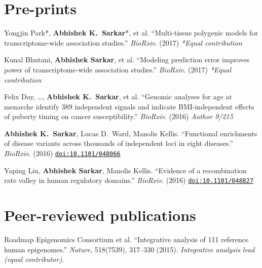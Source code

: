 \documentclass{article}
\begin{document}
\section*{Pre-prints}
\begin{henum}
\item Yongjin Park*, \textbf{Abhishek K.\ Sarkar}*, et al. ``Multi-tissue
  polygenic models for transcriptome-wide association studies.''
  \emph{BioRxiv}. (2017) \emph{*Equal contribution}
\item Kunal Bhutani, \textbf{Abhishek Sarkar}, et al. ``Modeling prediction
  error improves power of transcriptome-wide association studies.''
  \emph{BioRxiv}. (2017) \emph{*Equal contribution}
\item Felix Day, \ldots, \textbf{Abhishek K.\ Sarkar}, et al. ``Genomic
  analyses for age at menarche identify 389 independent signals and indicate
  BMI-independent effects of puberty timing on cancer susceptibility.''
  \emph{BioRxiv}. (2016) \emph{Author 9/215}
\item \textbf{Abhishek K.\ Sarkar}, Lucas D.\ Ward, Manolis Kellis.
  ``Functional enrichments of disease variants across thousands of independent
  loci in eight diseases.'' \emph{BioRxiv}. (2016)
  \href{http://biorxiv.org/content/early/2016/04/11/048066}{\texttt{doi:10.1101/048066}}
\item Yaping Liu, \textbf{Abhishek Sarkar}, Manolis Kellis. ``Evidence of a
  recombination rate valley in human regulatory domains.'' \emph{BioRxiv}.
  (2016) \href{http://biorxiv.org/content/early/2016/04/15/048827}{\texttt{doi:10.1101/048827}}
\end{henum}

\section*{Peer-reviewed publications}
\begin{henum}
\item Roadmap Epigenomics Consortium et al. ``Integrative analysis of 111
  reference human epigenomes.'' \emph{Nature}, 518(7539), 317–330 (2015).
  \emph{Integrative analysis lead (equal contributor)}.
\end{henum}
\end{document}
